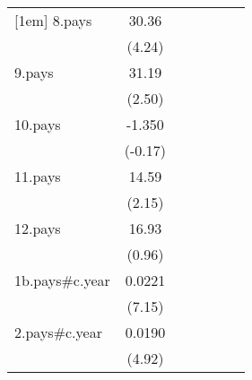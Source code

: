 {\begin{tabular}{l*{6}{c}}
[1em]
8.pays              &       30.36\sym{***}&                     &                     &                     &                     &                     \\
                    &      (4.24)         &                     &                     &                     &                     &                     \\
[1em]
9.pays              &       31.19\sym{*}  &                     &                     &                     &                     &                     \\
                    &      (2.50)         &                     &                     &                     &                     &                     \\
[1em]
10.pays             &      -1.350         &                     &                     &                     &                     &                     \\
                    &     (-0.17)         &                     &                     &                     &                     &                     \\
[1em]
11.pays             &       14.59\sym{*}  &                     &                     &                     &                     &                     \\
                    &      (2.15)         &                     &                     &                     &                     &                     \\
[1em]
12.pays             &       16.93         &                     &                     &                     &                     &                     \\
                    &      (0.96)         &                     &                     &                     &                     &                     \\
[1em]
1b.pays#c.year      &      0.0221\sym{***}&                     &                     &                     &                     &                     \\
                    &      (7.15)         &                     &                     &                     &                     &                     \\
[1em]
2.pays#c.year       &      0.0190\sym{***}&                     &                     &                     &                     &                     \\
                    &      (4.92)         &                     &                     &                     &                     &                     \\

\end{tabular}}

